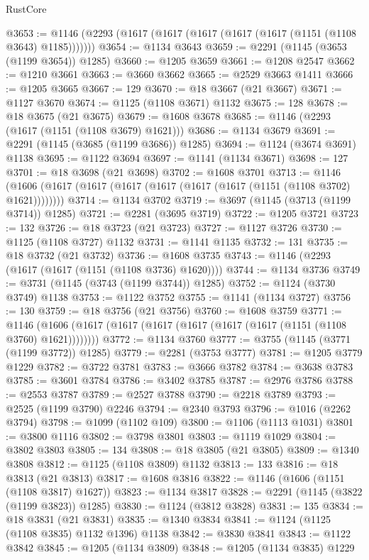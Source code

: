 \begin{lexlean}{RustCore}
\begin{coremodule}
@3653 := @1146 (@2293 (@1617 (@1617 (@1617 (@1617 (@1617 (@1151 (@1108 @3643) @1185)))))))
@3654 := @1134 @3643
@3659 := @2291 (@1145 (@3653 (@1199 @3654)) @1285)
@3660 := @1205 @3659
@3661 := @1208 @2547
@3662 := @1210 @3661
@3663 := @3660 @3662
@3665 := @2529 @3663 @1411
@3666 := @1205 @3665
@3667 := 129
@3670 := @18 @3667 (@21 @3667)
@3671 := @1127 @3670
@3674 := @1125 (@1108 @3671) @1132
@3675 := 128
@3678 := @18 @3675 (@21 @3675)
@3679 := @1608 @3678
@3685 := @1146 (@2293 (@1617 (@1151 (@1108 @3679) @1621)))
@3686 := @1134 @3679
@3691 := @2291 (@1145 (@3685 (@1199 @3686)) @1285)
@3694 := @1124 (@3674 @3691) @1138
@3695 := @1122 @3694
@3697 := @1141 (@1134 @3671)
@3698 := 127
@3701 := @18 @3698 (@21 @3698)
@3702 := @1608 @3701
@3713 := @1146 (@1606 (@1617 (@1617 (@1617 (@1617 (@1617 (@1617 (@1151 (@1108 @3702) @1621))))))))
@3714 := @1134 @3702
@3719 := @3697 (@1145 (@3713 (@1199 @3714)) @1285)
@3721 := @2281 (@3695 @3719)
@3722 := @1205 @3721
@3723 := 132
@3726 := @18 @3723 (@21 @3723)
@3727 := @1127 @3726
@3730 := @1125 (@1108 @3727) @1132
@3731 := @1141 @1135
@3732 := 131
@3735 := @18 @3732 (@21 @3732)
@3736 := @1608 @3735
@3743 := @1146 (@2293 (@1617 (@1617 (@1151 (@1108 @3736) @1620))))
@3744 := @1134 @3736
@3749 := @3731 (@1145 (@3743 (@1199 @3744)) @1285)
@3752 := @1124 (@3730 @3749) @1138
@3753 := @1122 @3752
@3755 := @1141 (@1134 @3727)
@3756 := 130
@3759 := @18 @3756 (@21 @3756)
@3760 := @1608 @3759
@3771 := @1146 (@1606 (@1617 (@1617 (@1617 (@1617 (@1617 (@1617 (@1151 (@1108 @3760) @1621))))))))
@3772 := @1134 @3760
@3777 := @3755 (@1145 (@3771 (@1199 @3772)) @1285)
@3779 := @2281 (@3753 @3777)
@3781 := @1205 @3779 @1229
@3782 := @3722 @3781
@3783 := @3666 @3782
@3784 := @3638 @3783
@3785 := @3601 @3784
@3786 := @3402 @3785
@3787 := @2976 @3786
@3788 := @2553 @3787
@3789 := @2527 @3788
@3790 := @2218 @3789
@3793 := @2525 (@1199 @3790) @2246
@3794 := @2340 @3793
@3796 := @1016 (@2262 @3794)
@3798 := @1099 (@1102 @109)
@3800 := @1106 (@1113 @1031)
@3801 := @3800 @1116
@3802 := @3798 @3801
@3803 := @1119 @1029
@3804 := @3802 @3803
@3805 := 134
@3808 := @18 @3805 (@21 @3805)
@3809 := @1340 @3808
@3812 := @1125 (@1108 @3809) @1132
@3813 := 133
@3816 := @18 @3813 (@21 @3813)
@3817 := @1608 @3816
@3822 := @1146 (@1606 (@1151 (@1108 @3817) @1627))
@3823 := @1134 @3817
@3828 := @2291 (@1145 (@3822 (@1199 @3823)) @1285)
@3830 := @1124 (@3812 @3828)
@3831 := 135
@3834 := @18 @3831 (@21 @3831)
@3835 := @1340 @3834
@3841 := @1124 (@1125 (@1108 @3835) @1132 @1396) @1138
@3842 := @3830 @3841
@3843 := @1122 @3842
@3845 := @1205 (@1134 @3809)
@3848 := @1205 (@1134 @3835) @1229

\end{coremodule}
\end{lexlean}

